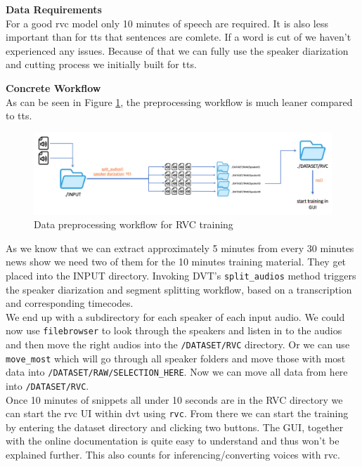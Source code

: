 \documentclass[
  a4paper,  %
  twoside,  %
  bibliography=totoc,
  headsepline,
  cleardoublepage=empty,
  parskip=half,
  draft=false
]{scrbook}
\begin{document}
\textbf{Data Requirements} \\
For a good \gls{rvc} model only 10 minutes of speech are required. It is also less important than for \gls{tts} that sentences are comlete. If a word is cut of we haven't experienced any issues. Because of that we can fully use the speaker diarization and cutting process we initially built for \gls{tts}. 

\textbf{Concrete Workflow} \\
As can be seen in Figure \ref{fig:rvc-wf}, the preprocessing workflow is much leaner compared to \gls{tts}.
\begin{figure}[h]
  \centering
  \includegraphics[width=1\textwidth]{./graphics/images/rvc/rvc-workflow.png}
  \caption{Data preprocessing workflow for RVC training}
  \label{fig:rvc-wf}
\end{figure}
As we know that we can extract approximately 5 minutes from every 30 minutes news show we need two of them for the 10 minutes training material. They get placed into the INPUT directory. Invoking DVT's \verb|split_audios| method triggers the speaker diarization and segment splitting workflow, based on a transcription and corresponding timecodes. \\
We end up with a subdirectory for each speaker of each input audio. We could now use \verb|filebrowser| to look through the speakers and listen in to the audios and then move the right audios into the \verb|/DATASET/RVC| directory. Or we can use \verb|move_most| which will go through all speaker folders and move those with most data into \verb|/DATASET/RAW/SELECTION_HERE|. Now we can move all data from here into \verb|/DATASET/RVC|. \\
Once 10 minutes of snippets all under 10 seconds are in the RVC directory we can start the \gls{rvc} UI within \gls{dvt} using \verb|rvc|. From there we can start the training by entering the dataset directory and clicking two buttons. The GUI, together with the online documentation is quite easy to understand and thus won't be explained further. This also counts for inferencing/converting voices with \gls{rvc}.
\end{document}
